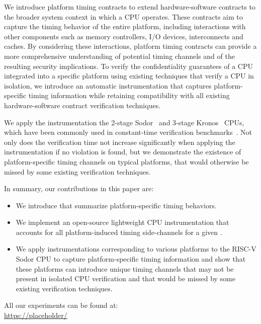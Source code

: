 We introduce platform timing contracts to extend hardware-software contracts to the broader system context in which a CPU operates.
% 
These contracts aim to capture the timing behavior of the entire platform, including interactions with other components such as memory controllers, I/O devices, interconnects and caches.
By considering these interactions, platform timing contracts can provide a more comprehensive understanding of potential timing channels and of the resulting security implications.
To verify the confidentiality guarantees of a CPU integrated into a specific platform using existing techniques that verify a CPU in isolation, we introduce an automatic instrumentation that captures platform-specific timing information while retaining compatibility with all existing hardware-software contract verification techniques.

We apply the instrumentation the 2-stage Sodor~\cite{sodor} and 3-stage Kronos~\cite{kronos} CPUs, which have been commonly used in constant-time verification benchmarks~\cite{wang2023specification,tan2025contractshadowlogic,ceesay2024mucfi}.
Not only does the verification time not increase significantly when applying the instrumentation if no violation is found, but we demonstrate the existence of platform-specific timing channels on typical platforms, that would otherwise be missed by some existing verification techniques.

In summary, our contributions in this paper are:
\begin{itemize}
    \item We introduce \pics that summarize platform-specific timing behaviors.
    
    \item We implement an open-source lightweight CPU instrumentation that accounts for all platform-induced timing side-channels for a given \pic.
    
    \item We apply instrumentations corresponding to various platforms to the RISC-V Sodor CPU to capture platform-specific timing information and show that these platforms can introduce unique timing channels that may not be present in isolated CPU verification and that would be missed by some existing verification techniques.
\end{itemize}

All our experiments can be found at: \\
\url{https://placeholder/} 

